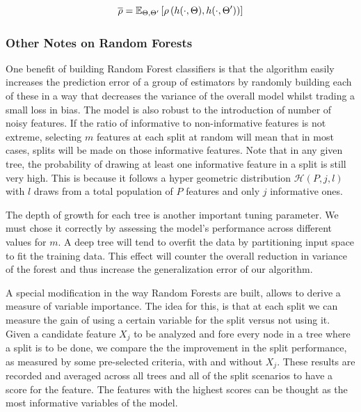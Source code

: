 \begin{equation}
\overline{\rho} =  \operatorname{\mathbb{E}}_{\Theta,\Theta'} \left[ \rho \left( h(\cdot{},\Theta) ,h(\cdot{},\Theta') \right)   \right]
\end{equation}

\subsubsection{Other Notes on Random Forests}
One benefit of building Random Forest classifiers is that the algorithm easily increases the prediction error of a group of estimators by randomly building each of these in a way that decreases the variance of the overall model whilst trading a small loss in bias. The model is also robust to the introduction of number of noisy features. If the ratio of informative to non-informative features is not extreme, selecting $m$ features at each split at random will mean that in most cases, splits will be made on those informative features. Note that in any given tree, the probability of drawing at least one informative feature in a split is still very high. This is because it follows a hyper geometric distribution $\mathcal{H}(P,j,l)$ with $l$ draws from a total population of $P$ features and only $j$ informative ones.

The depth of growth for each tree is another important tuning parameter. We must chose it correctly by assessing the model's performance across different values for $m$.  A deep tree will tend to overfit the data by partitioning input space to fit the training data. This effect will counter the overall reduction in variance of the forest and thus increase the generalization error of our algorithm.


A special modification in the way Random Forests are built, allows to derive a measure of variable importance. The idea for this, is that at each split we can measure the gain of using a certain variable for the split versus not using it. Given a candidate feature $X_j$ to be analyzed and fore every node in a tree where a split is to be done, we compare the the improvement in the split performance, as measured by some pre-selected criteria, with and without $X_j$. These results are recorded and averaged across all trees and all of the split scenarios to have a score for the feature. The features with the highest scores can be thought as the most informative variables of the model.



